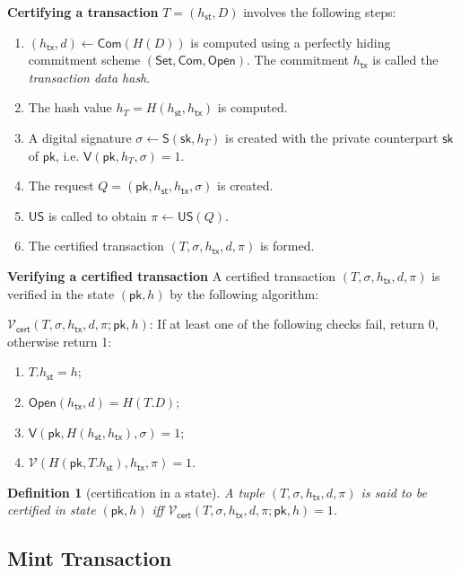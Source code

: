 \documentclass{article}
\newtheorem{definition}{Definition}[section]
\newcommand{\sig}[0]{\mathsf{S}}
\newcommand{\sigver}[0]{\mathsf{V}}
\newcommand{\pubkey}[0]{\mathsf{pk}}
\newcommand{\prikey}[0]{\mathsf{sk}}
\newcommand{\setup}[0]{\mathsf{Set}}
\newcommand{\commit}[0]{\mathsf{Com}}
\newcommand{\open}[0]{\mathsf{Open}}
\newcommand{\unisrv}[0]{\mathsf{US}}
\newcommand{\sthash}[0]{{h_\mathsf{st}}}
\newcommand{\txhash}[0]{{h_\mathsf{tx}}}
\newcommand{\univer}[0]{\mathcal{V}}
\newcommand{\certver}[0]{{\mathcal{V}_\mathsf{cert}}}
\begin{document}
\noindent\textbf{Certifying a transaction} $T = (\sthash, D)$ involves the following steps:
\begin{enumerate}
\item $(\txhash,d) \gets \commit(H(D))$ is computed using a perfectly hiding commitment scheme $(\setup,\commit,\open)$.
The commitment $\txhash$ is called the \emph{transaction data hash}.
\item The hash value $h_T = H(\sthash, \txhash)$ is computed.
\item A digital signature $\sigma \gets \sig(\prikey, h_T)$ is created with the private counterpart $\prikey$ of $\pubkey$, i.e. $\mathsf{V}(\pubkey, h_T, \sigma) = 1$.
\item The request $Q = (\pubkey,\sthash,\txhash,\sigma)$ is created.
\item $\unisrv$ is called to obtain $\pi\gets \unisrv(Q)$.
\item The certified transaction $(T,\sigma,\txhash,d,\pi)$ is formed.
\end{enumerate}

\noindent\textbf{Verifying a certified transaction} A certified transaction $(T,\sigma,\txhash,d,\pi)$ is verified in the state $(\pubkey,h)$ by the following algorithm:\medskip

\noindent $\certver(T,\sigma,\txhash,d,\pi;\pubkey,h)$:
If at least one of the following checks fail, return 0, otherwise return 1:
\begin{enumerate}
\item $T.\sthash=h$;
\item $\open(\txhash,d)=H(T.D)$;
\item $\sigver(\pubkey, H(\sthash,\txhash),\sigma)=1$;
\item $\univer(H(\pubkey,T.\sthash),\txhash,\pi)=1$.
\end{enumerate}

\begin{definition}[certification in a state]\label{de:certstate}
A tuple $(T,\sigma,\txhash,d,\pi)$ is said to be \emph{certified in state} $(\pubkey,h)$ iff $\certver(T,\sigma,\txhash,d,\pi;\pubkey,h)=1$.
\end{definition}


\subsection{Mint Transaction}\label{sec:mint-transaction}
\end{document}
